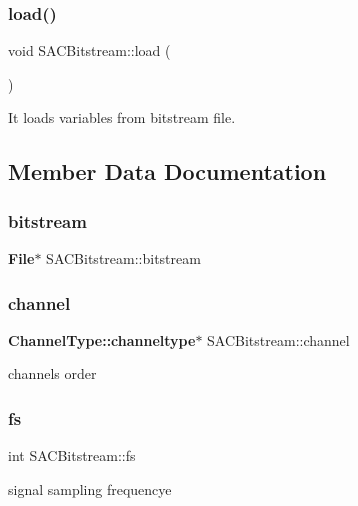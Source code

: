 \subsubsection{load()}
{\footnotesize\ttfamily void S\+A\+C\+Bitstream\+::load (\begin{DoxyParamCaption}{ }\end{DoxyParamCaption})}



It loads variables from bitstream file. 



\subsection{Member Data Documentation}
\mbox{\label{class_s_a_c_bitstream_a723578b5c58715e64c1ab8dfbbc97d71}} 
\subsubsection{bitstream}
{\footnotesize\ttfamily \textbf{ File}$\ast$ S\+A\+C\+Bitstream\+::bitstream\hspace{0.3cm}{\ttfamily [private]}}

\mbox{\label{class_s_a_c_bitstream_a4fa3fffab5ac8dc57bab6bbf64cf9a0d}} 
\subsubsection{channel}
{\footnotesize\ttfamily \textbf{ Channel\+Type\+::channeltype}$\ast$ S\+A\+C\+Bitstream\+::channel}

channels order \mbox{\label{class_s_a_c_bitstream_a94931a9831b06bba488d4f7b6f1e5744}} 
\subsubsection{fs}
{\footnotesize\ttfamily int S\+A\+C\+Bitstream\+::fs}

signal sampling frequencye \mbox{\label{class_s_a_c_bitstream_a2f4bba870168dd984a7ed4d5214024ed}} 
